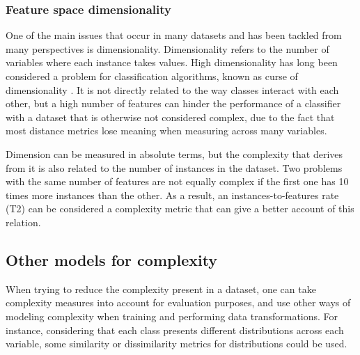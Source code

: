 \documentclass[
	fontsize=11pt, %
	twoside=false, %
	open=any, %
	secnumdepth=1, %
]{kaobook}
\newcommand{\change}[1]{{\color{blue}#1}}
\renewcommand{\change}[1]{#1}
\begin{document}
\subsubsection{Feature space dimensionality}

One of the main issues that occur in many datasets and has been tackled from many perspectives is dimensionality. Dimensionality refers to the number of variables where each instance takes values. High dimensionality has long been considered a problem for classification algorithms, known as curse of dimensionality \cite{aggarwal2001surprising}. It is not directly related to the way classes interact with each other, but a high number of features can hinder the performance of a classifier with a dataset that is otherwise not considered complex, due to the fact that most distance metrics lose meaning when measuring across many variables.

Dimension can be measured in absolute terms, but the complexity that derives from it is also related to the number of instances in the dataset. Two problems with the same number of features are not equally complex if the first one has 10 times more instances than the other. As a result, \change{an instances-to-features rate (T2) can be considered a complexity metric that can give a better account of this relation}.




\subsection{Other models for complexity}

When trying to reduce the complexity present in a dataset, one can take complexity measures into account for evaluation purposes, and use other ways of modeling complexity when training and performing data transformations. For instance, considering that each class presents different distributions across each variable, some similarity or dissimilarity metrics for distributions could be used.
\end{document}
